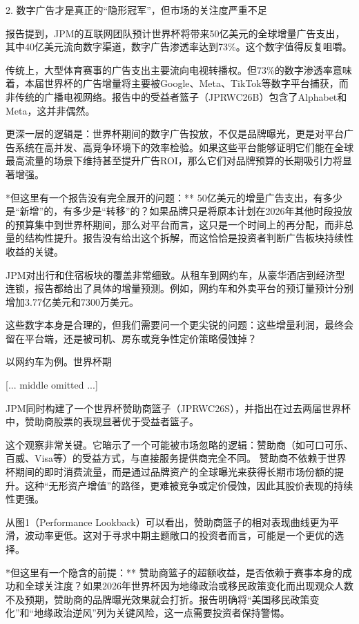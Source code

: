 \documentclass[11pt]{ctexart}
\begin{document}
2. 数字广告才是真正的“隐形冠军”，但市场的关注度严重不足

报告提到，JPM的互联网团队预计世界杯将带来50亿美元的全球增量广告支出，其中40亿美元流向数字渠道，数字广告渗透率达到73\%。这个数字值得反复咀嚼。

传统上，大型体育赛事的广告支出主要流向电视转播权。但73\%的数字渗透率意味着，本届世界杯的广告增量将主要被Google、Meta、TikTok等数字平台捕获，而非传统的广播电视网络。报告中的受益者篮子（JPRWC26B）包含了Alphabet和Meta，这并非偶然。

更深一层的逻辑是：世界杯期间的数字广告投放，不仅是品牌曝光，更是对平台广告系统在高并发、高竞争环境下的效率检验。如果这些平台能够证明它们能在全球最高流量的场景下维持甚至提升广告ROI，那么它们对品牌预算的长期吸引力将显著增强。

*但这里有一个报告没有完全展开的问题：** 50亿美元的增量广告支出，有多少是“新增”的，有多少是“转移”的？如果品牌只是将原本计划在2026年其他时段投放的预算集中到世界杯期间，那么对平台而言，这只是一个时间上的再分配，而非总量的结构性提升。报告没有给出这个拆解，而这恰恰是投资者判断广告板块持续性收益的关键。

JPM对出行和住宿板块的覆盖非常细致。从租车到网约车，从豪华酒店到经济型连锁，报告都给出了具体的增量预测。例如，网约车和外卖平台的预订量预计分别增加3.77亿美元和7300万美元。

这些数字本身是合理的，但我们需要问一个更尖锐的问题：这些增量利润，最终会留在平台端，还是被司机、房东或竞争性定价策略侵蚀掉？

以网约车为例。世界杯期

[... middle omitted ...]



JPM同时构建了一个世界杯赞助商篮子（JPRWC26S），并指出在过去两届世界杯中，赞助商股票的表现显著优于受益者篮子。

这个观察非常关键。它暗示了一个可能被市场忽略的逻辑：赞助商（如可口可乐、百威、Visa等）的受益方式，与直接服务提供商完全不同。 赞助商不依赖于世界杯期间的即时消费流量，而是通过品牌资产的全球曝光来获得长期市场份额的提升。这种“无形资产增值”的路径，更难被竞争或定价侵蚀，因此其股价表现的持续性更强。

从图1（Performance Lookback）可以看出，赞助商篮子的相对表现曲线更为平滑，波动率更低。这对于寻求中期主题敞口的投资者而言，可能是一个更优的选择。

*但这里有一个隐含的前提：** 赞助商篮子的超额收益，是否依赖于赛事本身的成功和全球关注度？如果2026年世界杯因为地缘政治或移民政策变化而出现观众人数不及预期，赞助商的品牌曝光效果就会打折。报告明确将“美国移民政策变化”和“地缘政治逆风”列为关键风险，这一点需要投资者保持警惕。
\end{document}
